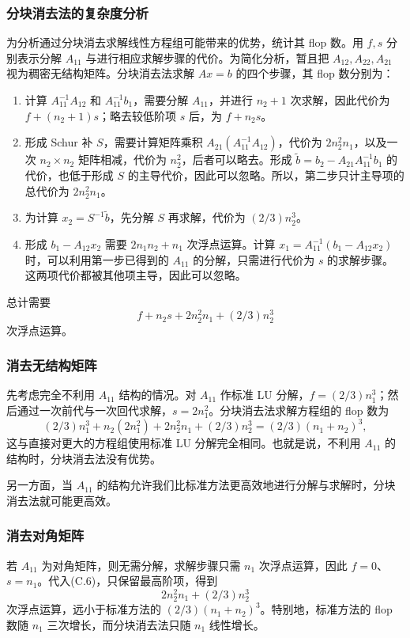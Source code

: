 \subsubsection*{分块消去法的复杂度分析}
为分析通过分块消去求解线性方程组可能带来的优势，统计其 flop 数。用 $f,s$ 分别表示分解 $A_{11}$ 与进行相应求解步骤的代价。为简化分析，暂且把 $A_{12},A_{22},A_{21}$ 视为稠密无结构矩阵。分块消去法求解 $Ax=b$ 的四个步骤，其 flop 数分别为：
\begin{enumerate}
\item 计算 $A_{11}^{-1}A_{12}$ 和 $A_{11}^{-1}b_1$，需要分解 $A_{11}$，并进行 $n_2+1$ 次求解，因此代价为 $f+(n_2+1)s$；略去较低阶项 $s$ 后，为 $f+n_2s$。
\item 形成 Schur 补 $S$，需要计算矩阵乘积 $A_{21}(A_{11}^{-1}A_{12})$，代价为 $2n_2^2n_1$，以及一次 $n_2\times n_2$ 矩阵相减，代价为 $n_2^2$，后者可以略去。形成 $\widetilde b=b_2-A_{21}A_{11}^{-1}b_1$ 的代价，也低于形成 $S$ 的主导代价，因此可以忽略。所以，第二步只计主导项的总代价为 $2n_2^2n_1$。
\item 为计算 $x_2=S^{-1}\widetilde b$，先分解 $S$ 再求解，代价为 $(2/3)n_2^3$。
\item 形成 $b_1-A_{12}x_2$ 需要 $2n_1n_2+n_1$ 次浮点运算。计算 $x_1=A_{11}^{-1}(b_1-A_{12}x_2)$ 时，可以利用第一步已得到的 $A_{11}$ 的分解，只需进行代价为 $s$ 的求解步骤。这两项代价都被其他项主导，因此可以忽略。
\end{enumerate}
总计需要
\begin{equation}
 f+n_2s+2n_2^2n_1+(2/3)n_2^3\tag{C.6}
\end{equation}
次浮点运算。

\subsubsection*{消去无结构矩阵}
先考虑完全不利用 $A_{11}$ 结构的情况。对 $A_{11}$ 作标准 LU 分解，$f=(2/3)n_1^3$；然后通过一次前代与一次回代求解，$s=2n_1^2$。分块消去法求解方程组的 flop 数为
\[
 (2/3)n_1^3+n_2(2n_1^2)+2n_2^2n_1+(2/3)n_2^3
 =(2/3)(n_1+n_2)^3,
\]
这与直接对更大的方程组使用标准 LU 分解完全相同。也就是说，不利用 $A_{11}$ 的结构时，分块消去法没有优势。

另一方面，当 $A_{11}$ 的结构允许我们比标准方法更高效地进行分解与求解时，分块消去法就可能更高效。

\subsubsection*{消去对角矩阵}
若 $A_{11}$ 为对角矩阵，则无需分解，求解步骤只需 $n_1$ 次浮点运算，因此 $f=0$、$s=n_1$。代入(C.6)，只保留最高阶项，得到
\[
 2n_2^2n_1+(2/3)n_2^3
\]
次浮点运算，远小于标准方法的 $(2/3)(n_1+n_2)^3$。特别地，标准方法的 flop 数随 $n_1$ 三次增长，而分块消去法只随 $n_1$ 线性增长。

